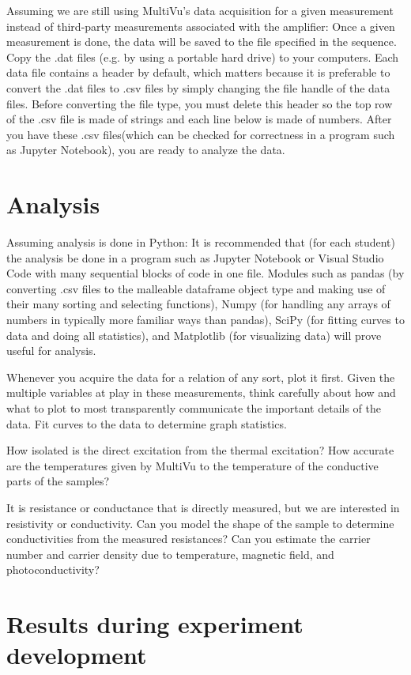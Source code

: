 \documentclass{article}
\begin{document}
Assuming we are still using MultiVu's data acquisition for a given measurement instead of third-party measurements associated with the amplifier: Once a given measurement is done, the data will be saved to the file specified in the sequence. Copy the .dat files (e.g. by using a portable hard drive) to your computers. Each data file contains a header by default, which matters because it is preferable to convert the .dat files to .csv files by simply changing the file handle of the data files. Before converting the file type, you must delete this header so the top row of the .csv file is made of strings and each line below is made of numbers. After you have these .csv files(which can be checked for correctness in a program such as Jupyter Notebook), you are ready to analyze the data.

\section*{Analysis}

Assuming analysis is done in Python: It is recommended that (for each student) the analysis be done in a program such as Jupyter Notebook or Visual Studio Code with many sequential blocks of code in one file. Modules such as pandas (by converting .csv files to the malleable dataframe object type and making use of their many sorting and selecting functions), Numpy (for handling any arrays of numbers in typically more familiar ways than pandas), SciPy (for fitting curves to data and doing all statistics), and Matplotlib (for visualizing data) will prove useful for analysis.

Whenever you acquire the data for a relation of any sort, plot it first. Given the multiple variables at play in these measurements, think carefully about how and what to plot to most transparently communicate the important details of the data. Fit curves to the data to determine graph statistics.

How isolated is the direct excitation from the thermal excitation? How accurate are the temperatures given by MultiVu to the temperature of the conductive parts of the samples?

It is resistance or conductance that is directly measured, but we are interested in resistivity or conductivity. Can you model the shape of the sample to determine conductivities from the measured resistances? Can you estimate the carrier number and carrier density due to temperature, magnetic field, and photoconductivity?

\section*{Results during experiment development}
\end{document}
